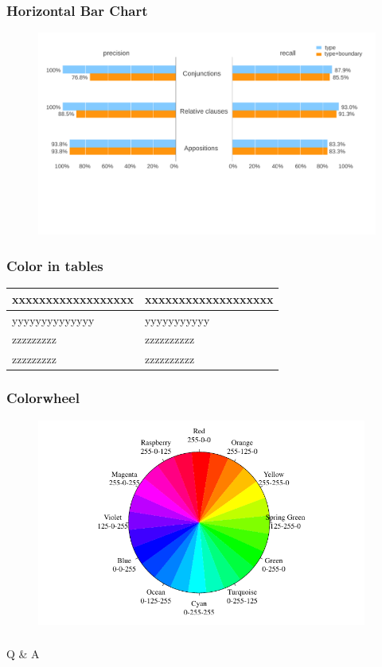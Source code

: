 \documentclass{beamer}
\begin{document}
\begin{frame}[label=bar2,fragile]
  \frametitle{Horizontal Bar Chart}
  \begin{figure}
    \includegraphics[width=\textwidth]{precision7.pdf}
  \end{figure}
\end{frame}

\begin{frame}[label=color,fragile]
  \frametitle{Color in tables}
  \begin{table}
  \begin{tabular}{l|l}
    \hline
    \rowcolor{udelblue}\color{white}xxxxxxxxxxxxxxxxxx 
      & \color{white}xxxxxxxxxxxxxxxxxxx \\
    \hline
    yyyyyyyyyyyyyy & yyyyyyyyyyy \\
    zzzzzzzzz & zzzzzzzzzz \\
    zzzzzzzzz & zzzzzzzzzz \\
    \hline
  \end{tabular}
  \end{table}
\end{frame}

\begin{frame}[label=colorwheel,fragile]
  \frametitle{Colorwheel}
  \begin{figure}
    \includegraphics[height=6.8cm]{colorwheel.pdf}
  \end{figure} 
\end{frame}

\begin{frame}
	\frametitle{\;}
  \begin{center}
    \huge Q \& A \vspace{1em}
  \end{center}
\end{frame}
\end{document}
